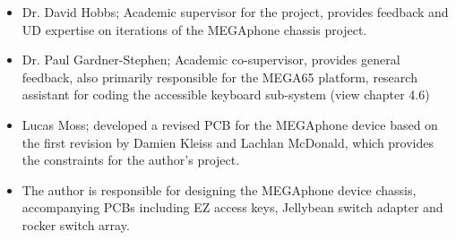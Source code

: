 \begin{itemize} 
    \item Dr. David Hobbs; Academic supervisor for the project, provides feedback and UD expertise on iterations of the MEGAphone chassis project.
    \item Dr. Paul Gardner-Stephen; Academic co-supervisor, provides general feedback, also primarily responsible for the MEGA65 platform, research assistant for coding the accessible keyboard sub-system (view chapter 4.6)
    \item Lucas Moss; developed a revised PCB for the MEGAphone device based on the first revision by Damien Kleiss and Lachlan McDonald, which provides the constraints for the author's project.
    \item The author is responsible for designing the MEGAphone device chassis, accompanying PCBs including EZ access keys, Jellybean switch adapter and rocker switch array.
    \end{itemize}